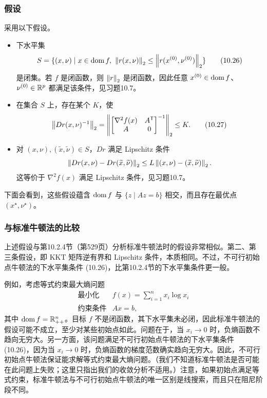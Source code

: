 \subsubsection*{假设}
采用以下假设。
\begin{itemize}
\item 下水平集
\begin{equation}S=\{(x,\nu)\mid x\in\dom f,\ \norm{r(x,\nu)}_2\le\norm{r(x^{(0)},\nu^{(0)})}_2\}\tag{10.26}\end{equation}
是闭集。若 $f$ 是闭函数，则 $\left\lVert r\right\rVert_2$ 是闭函数，因此任意 $x^{(0)}\in\operatorname{dom} f$、$\nu^{(0)}\in\mathbb R^p$ 都满足该条件，见习题10.7。
\item 在集合 $S$ 上，存在某个 $K$，使
\begin{equation}\left\lVert Dr(x,\nu)^{-1}\right\rVert_2=\left\|\begin{bmatrix}\nabla^2f(x)&A^\mathsf T\\A&0\end{bmatrix}^{-1}\right\|_2\le K.\tag{10.27}\end{equation}

\item 对 $(x,\nu),(\widetilde x,\widetilde\nu)\in S$，$Dr$ 满足 Lipschitz 条件
\[\left\lVert Dr(x,\nu)-Dr(\widetilde x,\widetilde\nu)\right\rVert_2\le L\left\lVert (x,\nu)-(\widetilde x,\widetilde\nu)\right\rVert_2.\]
这等价于 $\nabla^2f(x)$ 满足 Lipschitz 条件，见习题10.7。
\end{itemize}
下面会看到，这些假设蕴含 $\operatorname{dom} f$ 与 $\{z\mid Az=b\}$ 相交，而且存在最优点 $(x^\star,\nu^\star)$。

\subsubsection*{与标准牛顿法的比较}
上述假设与第10.2.4节（第529页）分析标准牛顿法时的假设非常相似。第二、第三条假设，即 KKT 矩阵逆有界和 Lipschitz 条件，本质相同。不过，不可行初始点牛顿法的下水平集条件 (10.26)，比第10.2.4节的下水平集条件更一般。

例如，考虑等式约束最大熵问题
\[\begin{array}{ll}\text{最小化}&f(x)=\displaystyle\sum_{i=1}^n x_i\log x_i\\\text{约束条件}&Ax=b,\end{array}\]
其中 $\operatorname{dom} f=\mathbb R_{++}^n$。目标 $f$ 不是闭函数，其下水平集未必闭，因此标准牛顿法的假设可能不成立，至少对某些初始点如此。问题在于，当 $x_i\to0$ 时，负熵函数不趋向无穷大。另一方面，该问题满足不可行初始点牛顿法的下水平集条件 (10.26)，因为当 $x_i\to0$ 时，负熵函数的梯度范数确实趋向无穷大。因此，不可行初始点牛顿法保证能求解等式约束最大熵问题。（我们不知道标准牛顿法是否可能在此问题上失败；这里只指出我们的收敛分析不适用。）注意，如果初始点满足等式约束，标准牛顿法与不可行初始点牛顿法的唯一区别是线搜索，而且只在阻尼阶段不同。

